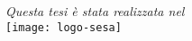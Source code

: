 \begin{titlepage}
\nonumber
\null {}
\begin{flushright}
{\textit{Questa tesi è stata realizzata nel} \hspace*{0.25cm}}
\\
\vspace{0.5cm}
\texttt{[image: logo-sesa]}
\end{flushright}
\end{titlepage}
